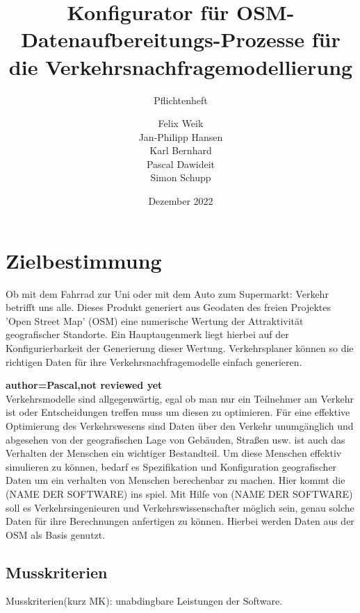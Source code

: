 \documentclass[parskip=full]{scrartcl} %
\title{Konfigurator für OSM-Datenaufbereitungs-Prozesse für die Verkehrsnachfragemodellierung}
\subtitle{Pflichtenheft}
\author{Felix Weik\\ Jan-Philipp Hansen\\ Karl Bernhard\\ Pascal Dawideit\\ Simon Schupp}
\date{Dezember 2022}
\begin{document}
\maketitle
\newpage

\tableofcontents
\newpage




\section{Zielbestimmung}
Ob mit dem Fahrrad zur Uni oder mit dem Auto zum Supermarkt: Verkehr betrifft uns alle. Dieses Produkt generiert aus Geodaten des freien Projektes 'Open Street Map' (OSM) eine numerische Wertung der Attraktivität geografischer Standorte. Ein Hauptaugenmerk liegt hierbei auf der Konfigurierbarkeit der Generierung dieser Wertung. Verkehrsplaner können so die richtigen Daten für ihre Verkehrsnachfragemodelle einfach generieren.


\textbf{author=Pascal,not reviewed yet\\}
Verkehrsmodelle sind allgegenwärtig, egal ob man nur ein Teilnehmer am Verkehr ist oder Entscheidungen treffen muss um diesen zu optimieren.
Für eine effektive Optimierung des Verkehrswesens sind Daten über den Verkehr unumgänglich und abgesehen von der geografischen Lage von Gebäuden, Straßen usw. ist auch das Verhalten der Menschen ein wichtiger Bestandteil.
Um diese Menschen effektiv simulieren zu können, bedarf es Spezifikation und Konfiguration geografischer Daten um ein verhalten von Menschen berechenbar zu machen.
Hier kommt die (NAME DER SOFTWARE) ins spiel.
Mit Hilfe von (NAME DER SOFTWARE) soll es  Verkehrsingenieuren und Verkehrswissenschafter möglich sein, genau solche Daten für ihre Berechnungen anfertigen zu können.
Hierbei werden Daten aus der OSM als Basis genutzt.

\subsection{Musskriterien}
Musskriterien(kurz MK): unabdingbare Leistungen der Software.
\end{document}
